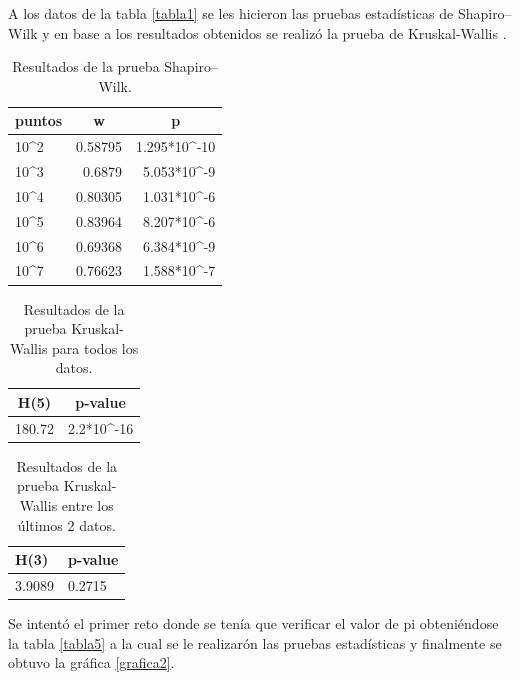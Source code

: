 \documentclass{article}
\begin{document}
A los datos de la tabla \ref{tabla1} se les hicieron las pruebas estadísticas de Shapiro–Wilk \cite{shapiro} y en base a los resultados obtenidos se realizó la prueba de Kruskal-Wallis \cite{Kruskall}.

\newpage

\begin{table}[h!]
\centering
\caption{Resultados de la prueba Shapiro–Wilk.}
\label{tabla2}
\begin{tabular}{|l|r|r|}
\hline
\multicolumn{1}{|c|}{puntos} & \multicolumn{1}{c|}{w} & \multicolumn{1}{c|}{p} \\ \hline
10\textasciicircum{}2 & 0.58795 & 1.295*10\textasciicircum{}-10 \\ \hline
10\textasciicircum{}3 & 0.6879 & 5.053*10\textasciicircum{}-9 \\ \hline
10\textasciicircum{}4 & 0.80305 & 1.031*10\textasciicircum{}-6 \\ \hline
10\textasciicircum{}5 & 0.83964 & 8.207*10\textasciicircum{}-6 \\ \hline
10\textasciicircum{}6 & 0.69368 & 6.384*10\textasciicircum{}-9 \\ \hline
10\textasciicircum{}7 & 0.76623 & 1.588*10\textasciicircum{}-7 \\ \hline
\end{tabular}
\end{table}

\begin{table}[h!]
\centering
\caption{Resultados de la prueba Kruskal-Wallis para todos los datos.}
\label{tabla3}
\begin{tabular}{|c|c|}
\hline
H(5) & p-value \\ \hline
180.72 & \multicolumn{1}{r|}{2.2*10\textasciicircum{}-16} \\ \hline
\end{tabular}
\end{table}

\begin{table}[h!]
\centering
\caption{Resultados de la prueba Kruskal-Wallis entre los últimos 2 datos.}
\label{tabla}
\begin{tabular}{|l|l|}
\hline
H(3) & p-value \\ \hline
3.9089 & 0.2715 \\ \hline
\end{tabular}
\end{table}

Se intentó el primer reto donde se tenía que verificar el valor de pi \cite{pi} obteniéndose la tabla \ref{tabla5} a la cual se le realizarón las pruebas estadísticas y finalmente se obtuvo la gráfica \ref{grafica2}. 
\end{document}
